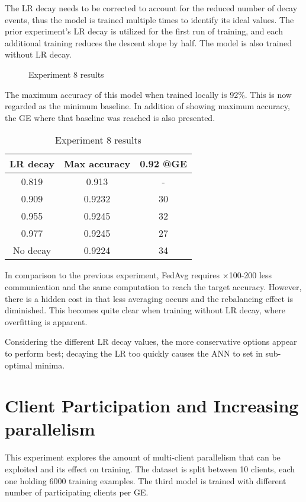 The LR decay needs to be corrected to account for the reduced number of decay events, thus the model is trained multiple times to identify its ideal values. The prior experiment's LR decay is utilized for the first run of training, and each additional training reduces the descent slope by half. The model is also trained without LR decay.
    
\begin{figure}[H]
    \center
    
    \caption[Experiment 8 results]{Experiment 8 results}
    \label{fig:Experiment 8 results}
\end{figure}

The maximum accuracy of this model when trained locally is 92\%. This is now regarded as the minimum baseline. In addition of showing maximum accuracy, the GE where that baseline was reached is also presented.

\begin{table}[H]
    \center
    \begin{tabular}
        { | c | c | c | }
        \hline
        LR decay & Max accuracy & 0.92 @GE\\\hline
        0.819 & 0.913 & -\\\hline
        0.909 & 0.9232 & 30\\\hline
        0.955 & 0.9245 & 32\\\hline
        0.977 & 0.9245 & 27\\\hline
        No decay & 0.9224 & 34\\\hline
    \end{tabular}
    \caption[Experiment 8 results]{Experiment 8 results}
    \label{table:Experiment 8 results}
\end{table}

In comparison to the previous experiment, FedAvg requires \(\times\)100-200 less communication and the same computation to reach the target accuracy. However, there is a hidden cost in that less averaging occurs and the rebalancing effect is diminished. This becomes quite clear when training without LR decay, where overfitting is apparent.

Considering the different LR decay values, the more conservative options appear to perform best; decaying the LR too quickly causes the ANN to set in sub-optimal minima.

\section{Client Participation and Increasing parallelism}
This experiment explores the amount of multi-client parallelism that can be exploited and its effect on training. The dataset is split between 10 clients, each one holding 6000 training examples. The third model is trained with different number of participating clients per GE. 
    
